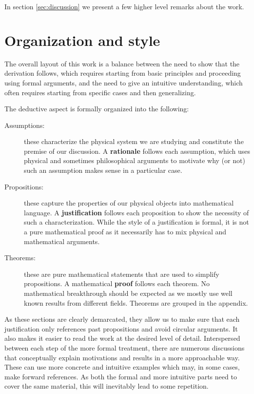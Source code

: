 \documentclass[smallextended]{svjour3}
\numberwithin{equation}{section}
\begin{document}
In section \ref{sec:discussion} we present a few higher level remarks about the work.

\section{Organization and style}

The overall layout of this work is a balance between the need to show that the derivation follows, which requires starting from basic principles and proceeding using formal arguments, and the need to give an intuitive understanding, which often requires starting from specific cases and then generalizing.

The deductive aspect is formally organized into the following:
\begin{description}
  \item[Assumptions:] these characterize the physical system we are studying and constitute the premise of our discussion. A \textbf{rationale} follows each assumption, which uses physical and sometimes philosophical arguments to motivate why (or not) such an assumption makes sense in a particular case.
  
  \item[Propositions:] these capture the properties of our physical objects into mathematical language. A \textbf{justification} follows each proposition to show the necessity of such a characterization. While the style of a justification is formal, it is not a pure mathematical proof as it necessarily has to mix physical and mathematical arguments.
  
  \item[Theorems:] these are pure mathematical statements that are used to simplify propositions. A mathematical \textbf{proof} follows each theorem. No mathematical breakthrough should be expected as we mostly use well known results from different fields. Theorems are grouped in the appendix.
\end{description}

As these sections are clearly demarcated, they allow us to make sure that each justification only references past propositions and avoid circular arguments. It also makes it easier to read the work at the desired level of detail. Interspersed between each step of the more formal treatment, there are numerous discussions that conceptually explain motivations and results in a more approachable way. These can use more concrete and intuitive examples which may, in some cases, make forward references. As both the formal and more intuitive parts need to cover the same material, this will inevitably lead to some repetition.
\end{document}
